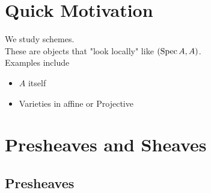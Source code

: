 \documentclass[../main.tex]{subfiles}
\begin{document}
\section*{Quick Motivation}
We study schemes.\\
These are objects that "look locally" like $( \operatorname{Spec} A, A ) $.\\
Examples include
\begin{itemize}
\item $A$ itself
\item Varieties in affine or Projective 
\end{itemize}
\section{Presheaves and Sheaves}
\subsection{Presheaves}
\end{document}
